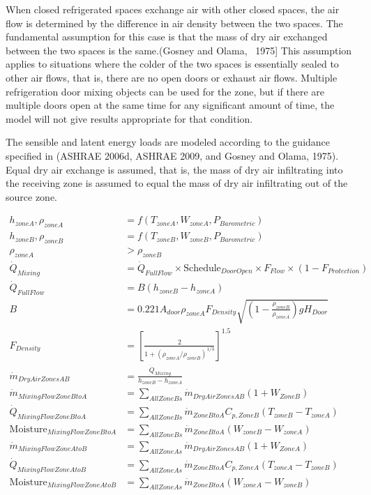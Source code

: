 When closed refrigerated spaces exchange air with other closed spaces, the air flow is determined by the difference in air density between the two spaces. The fundamental assumption for this case is that the mass of dry air exchanged between the two spaces is the same.(Gosney and Olama, ~1975{]} This assumption applies to situations where the colder of the two spaces is essentially sealed to other air flows, that is, there are no open doors or exhaust air flows. Multiple refrigeration door mixing objects can be used for the zone, but if there are multiple doors open at the same time for any significant amount of time, the model will not give results appropriate for that condition.

The sensible and latent energy loads are modeled according to the guidance specified in (ASHRAE 2006d, ASHRAE 2009, and Gosney and Olama, 1975).~ Equal dry air exchange is assumed, that is, the mass of dry air infiltrating into the receiving zone is assumed to equal the mass of dry air infiltrating out of the source zone.

\begin{equation}
  \begin{array}{cl}
    h_{zoneA},\rho_{zoneA} & = f (T_{zoneA},W_{zoneA},P_{Barometric}) \\
    h_{zoneB},\rho_{zoneB} & = f (T_{zoneB},W_{zoneB},P_{Barometric}) \\
    \rho_{zoneA} & > \rho_{zoneB} \\
    \dot{Q}_{Mixing} & = \dot{Q}_{FullFlow} \times \text{Schedule}_{DoorOpen} \times F_{Flow} \times (1-F_{Protection}) \\
    \dot{Q}_{FullFlow} & = B (h_{zoneB}-h_{zoneA}) \\
    B & = 0.221 A_{door} \rho_{zoneA} F_{Density} \sqrt{ \left(1-\frac{\rho_{zoneB}}{\rho_{zoneA}}\right) g H_{Door} } \\
    F_{Density} & = \left[ \frac{2}{1+\left(\rho_{zoneA}/\rho_{zoneB}\right)^{1/3}} \right]^{1.5} \\
    \dot{m}_{DryAirZonesAB} & = \frac{\dot{Q}_{Mixing}}{h_{zoneB}-h_{zoneA}} \\
    \dot{m}_{MixingFlowZoneBtoA} & = \sum_{AllZoneBs} \dot{m}_{DryAirZonesAB}\left(1+W_{ZoneB}\right) \\
    \dot{Q}_{MixingFlowZoneBtoA} & = \sum_{AllZoneBs} \dot{m}_{ZoneBtoA} C_{p,ZoneB} \left(T_{zoneB}-T_{zoneA}\right) \\
    \text{Moisture}_{MixingFlowZoneBtoA} & = \sum_{AllZoneBs} \dot{m}_{ZoneBtoA} \left( W_{zoneB}-W_{zoneA} \right) \\
    \dot{m}_{MixingFlowZoneAtoB} & = \sum_{AllZoneAs} \dot{m}_{DryAirZonesAB}\left(1+W_{ZoneA}\right) \\
    \dot{Q}_{MixingFlowZoneAtoB} & = \sum_{AllZoneAs} \dot{m}_{ZoneBtoA} C_{p,ZoneA} \left(T_{zoneA}-T_{zoneB}\right) \\
    \text{Moisture}_{MixingFlowZoneAtoB} & = \sum_{AllZoneAs} \dot{m}_{ZoneBtoA} \left( W_{zoneA}-W_{zoneB} \right) 
  \end{array}
\end{equation}

